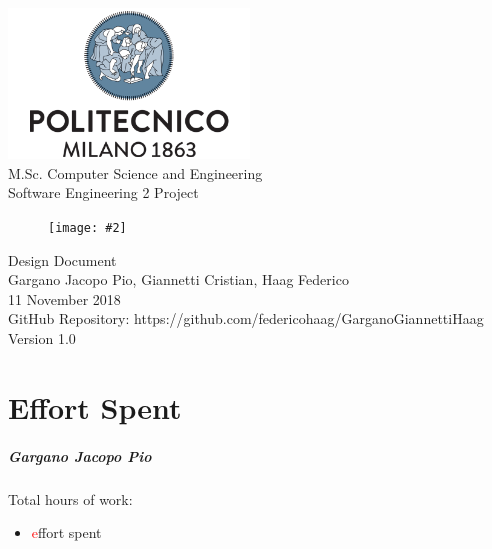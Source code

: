 \documentclass{report}
\newcommand\todo[1]{\textcolor{red}{#1}}
\newcommand{\image}[4]{
	\begin{figure}[H]
	\centering
	\texttt{[image: \#2]}
	\caption*{#3}
	\label{#4}

	\label{fig:nonfloat} %
	\end{figure}
}
\begin{document}
	\begin{titlepage}
		\centering	
		\vfill
		{
			\includegraphics[width =\linewidth, height = 4cm, keepaspectratio]{PolitecnicoLogo.png}
			\label{fig:PolitecnicoLogo}
			\large \\[2ex]M.Sc. Computer Science and Engineering\\
			\large Software Engineering 2 Project\\[9ex]			
			\image{5cm}{TrackMeLogo.png}{}{TrackMeLogo}
			\huge Design Document\\[4ex]

			\normalsize Gargano Jacopo Pio, Giannetti Cristian, Haag Federico\\[1.5ex]
			\normalsize 11 November 2018 \\[1.5ex]
			\normalsize GitHub Repository: https://github.com/federicohaag/GarganoGiannettiHaag\\[3ex]
			\normalsize Version 1.0
		}
		
	\end{titlepage}

	\newpage
	\tableofcontents
	\thispagestyle{fancy}
	
	\newpage
	
	
	
	
	
	
		
	\chapter{Effort Spent}
	\thispagestyle{fancy}
		\paragraph{Gargano Jacopo Pio} Total hours of work: 
			\begin{itemize}
				\item\todo effort spent
			\end{itemize}
\end{document}
